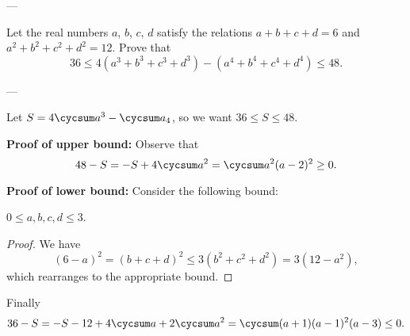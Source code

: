 
---

Let the real numbers $a$, $b$, $c$, $d$ satisfy the relations $a+b+c+d=6$ and $a^2+b^2+c^2+d^2=12$. Prove that
\[36\le4\left(a^3+b^3+c^3+d^3\right)-\left(a^4+b^4+c^4+d^4\right)\le48.\]

---

Let $S=4\cycsum a^3-\cycsum a_4$, so we want $36\le S\le48$.

\bigskip

\textbf{Proof of upper bound:} Observe that \[48-S=-S+4\cycsum a^2=\cycsum a^2(a-2)^2\ge0.\]

\textbf{Proof of lower bound:} Consider the following bound:
\begin{claim*}
    $0\le a,b,c,d\le3$.
\end{claim*}
\begin{proof}
    We have \[(6-a)^2=(b+c+d)^2\le3\left(b^2+c^2+d^2\right)=3\left(12-a^2\right),\]
    which rearranges to the appropriate bound.
\end{proof}

Finally \[36-S=-S-12+4\cycsum a+2\cycsum a^2=\cycsum(a+1)(a-1)^2(a-3)\le0.\]

